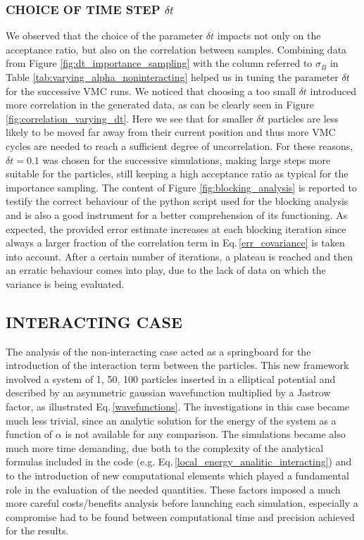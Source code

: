 \subsubsection*{CHOICE OF TIME STEP $\delta t$}
We observed that the choice of the parameter $\delta t$ impacts not only on the acceptance ratio, but also on the correlation between samples. Combining data from Figure \ref{fig:dt_importance_sampling} with the column referred to $\sigma_B$ in Table \ref{tab:varying_alpha_noninteracting} helped us in tuning the parameter $\delta t$ for the successive VMC runs. We noticed that choosing a too small $\delta t$ introduced more correlation in the generated data, as can be clearly seen in Figure \ref{fig:correlation_varying_dt}. Here we see that for smaller $\delta t$ particles are less likely to be moved far away from their current position and thus more VMC cycles are needed to reach a sufficient degree of uncorrelation. For these reasons, $\delta t=0.1$ was chosen for the successive simulations, making large steps more suitable for the particles, still keeping a high acceptance ratio as typical for the importance sampling. The content of Figure \ref{fig:blocking_analysis} is reported to testify the correct behaviour of the python script used for the blocking analysis and is also a good instrument for a better comprehension of its functioning. As expected, the provided error estimate increases at each blocking iteration since always a larger fraction of the correlation term in Eq.\,\ref{err_covariance} is taken into account. After a certain number of iterations, a plateau is reached and then an erratic behaviour comes into play, due to the lack of data on which the variance is being evaluated. \\

\subsection{INTERACTING CASE}
The analysis of the non-interacting case acted as a springboard for the introduction of the interaction term between the particles. This new framework involved a system of 1, 50, 100 particles inserted in a elliptical potential and described by an asymmetric gaussian wavefunction multiplied by a Jastrow factor, as illustrated Eq.\,\ref{wavefunctions}. The investigations in this case became much less trivial, since an analytic solution for the energy of the system as a function of $\alpha$ is not available for any comparison. The simulations became also much more time demanding, due both to the complexity of the analytical formulas included in the code (e.g. Eq.\,\ref{local_energy_analitic_interacting}) and to the introduction of new computational elements which played a fundamental role in the evaluation of the needed quantities. These factors imposed a much more careful costs/benefits analysis before launching each simulation, especially a compromise had to be found between computational time and precision achieved for the results. 


